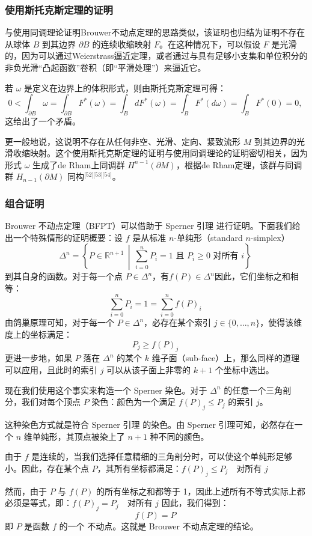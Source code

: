 \subsubsection{使用斯托克斯定理的证明}
与使用同调理论证明Brouwer不动点定理的思路类似，该证明也归结为证明不存在从球体 $B$ 到其边界 $\partial B$ 的连续收缩映射 $F$。在这种情况下，可以假设 $F$ 是光滑的，因为可以通过Weierstrass逼近定理，或者通过与具有足够小支集和单位积分的非负光滑“凸起函数”卷积（即“平滑处理”）来逼近它。

若 $\omega$ 是定义在边界上的体积形式，则由斯托克斯定理可得：
$$
0 < \int_{\partial B} \omega = \int_{\partial B} F^{*}(\omega) = \int_{B} dF^{*}(\omega) = \int_{B} F^{*}(d\omega) = \int_{B} F^{*}(0) = 0,~
$$
这给出了一个矛盾。

更一般地说，这说明不存在从任何非空、光滑、定向、紧致流形 $M$ 到其边界的光滑收缩映射。这个使用斯托克斯定理的证明与使用同调理论的证明密切相关，因为形式 $\omega$ 生成了de Rham上同调群 $H^{n-1}(\partial M)$，根据de Rham定理，该群与同调群 $H_{n-1}(\partial M)$ 同构\(^\text{[52][53][54]}\)。
\subsubsection{组合证明}
Brouwer 不动点定理（BFPT）可以借助于 Sperner 引理 进行证明。下面我们给出一个特殊情形的证明概要：设 $f$ 是从标准 $n$-单纯形（standard $n$-simplex）
$$
\Delta^n = \left\{ P \in \mathbb{R}^{n+1} \,\middle|\, \sum_{i=0}^{n} P_i = 1 \text{ 且 } P_i \geq 0 \text{ 对所有 } i \right\}~
$$
到其自身的函数。对于每一个点 $P \in \Delta^n$，有$f(P) \in \Delta^n$因此，它们坐标之和相等：
$$
\sum_{i=0}^{n} P_i = 1 = \sum_{i=0}^{n} f(P)_i~
$$
由鸽巢原理可知，对于每一个 $P \in \Delta^n$，必存在某个索引 $j \in \{0, \ldots, n\}$，使得该维度上的坐标满足：
$$
P_j \geq f(P)_j~
$$
更进一步地，如果 $P$ 落在 $\Delta^n$ 的某个 $k$ 维子面（sub-face）上，那么同样的道理可以应用，且此时的索引 $j$ 可以从该子面上非零的 $k + 1$ 个坐标中选出。

现在我们使用这个事实来构造一个 Sperner 染色。对于 $\Delta^n$ 的任意一个三角剖分，我们对每个顶点 $P$ 染色：颜色为一个满足 $f(P)_j \leq P_j$ 的索引 $j$。

这种染色方式就是符合 Sperner 引理 的染色。由 Sperner 引理可知，必然存在一个 $n$ 维单纯形，其顶点被染上了 $n + 1$ 种不同的颜色。

由于 $f$ 是连续的，当我们选择任意精细的三角剖分时，可以使这个单纯形足够小。因此，存在某个点 $P$，其所有坐标都满足：$f(P)_j \leq P_j \quad \text{对所有 } j$

然而，由于 $P$ 与 $f(P)$ 的所有坐标之和都等于 1，因此上述所有不等式实际上都必须是等式，即：$f(P)_j = P_j \quad \text{对所有 } j$
因此，我们得到：
$$
f(P) = P~
$$
即 $P$ 是函数 $f$ 的一个 不动点。这就是 Brouwer 不动点定理的结论。
